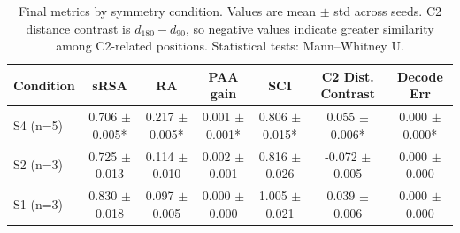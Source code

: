\begin{table}[h]
\centering
\caption{Final metrics by symmetry condition. Values are mean $\pm$ std across seeds. C2 distance contrast is $d_{180}-d_{90}$, so negative values indicate greater similarity among C2-related positions. Statistical tests: Mann--Whitney U.}
\begin{tabular}{lcccccc}
\toprule
Condition & sRSA & RA & PAA gain & SCI & C2 Dist. Contrast & Decode Err \\
\midrule
S4 (n=5) & 0.706 $\pm$ 0.005* & 0.217 $\pm$ 0.005* & 0.001 $\pm$ 0.001* & 0.806 $\pm$ 0.015* & 0.055 $\pm$ 0.006* & 0.000 $\pm$ 0.000* \\
S2 (n=3) & 0.725 $\pm$ 0.013 & 0.114 $\pm$ 0.010 & 0.002 $\pm$ 0.001 & 0.816 $\pm$ 0.026 & -0.072 $\pm$ 0.005 & 0.000 $\pm$ 0.000 \\
S1 (n=3) & 0.830 $\pm$ 0.018 & 0.097 $\pm$ 0.005 & 0.000 $\pm$ 0.000 & 1.005 $\pm$ 0.021 & 0.039 $\pm$ 0.006 & 0.000 $\pm$ 0.000 \\
\bottomrule
\end{tabular}
\end{table}
